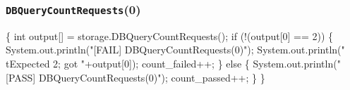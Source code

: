 \documentclass{article}
\def\nwendcode{\endtrivlist \endgroup}
\let\nwdocspar=\par
\begin{document}
\subsubsection{{\tt{}DBQueryCountRequests}(0)}
\nwenddocs{}\endmoddef{}
\{
  int output[] = storage.DBQueryCountRequests();
  if (!(output[0] == 2)) \{
    System.out.println("[FAIL] DBQueryCountRequests(0)");
    System.out.println("\\tExpected 2; got "+output[0]);
    count_failed++;
  \} else \{
    System.out.println("[PASS] DBQueryCountRequests(0)");
    count_passed++;
  \}
\}
\nwendcode{}\nwdocspar
\end{document}

